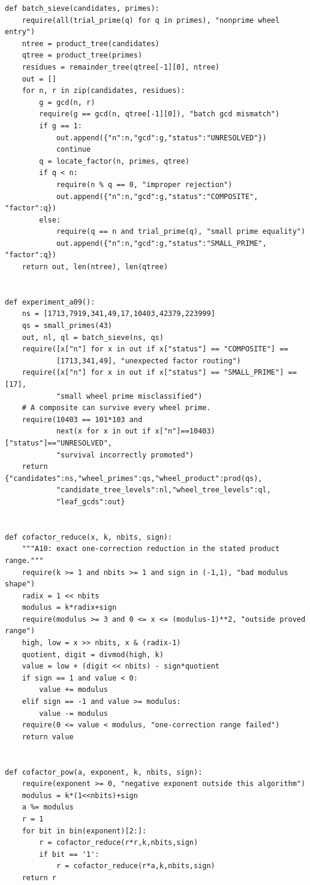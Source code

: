 \documentclass[11pt,a4paper]{article}
\theoremstyle{definition}\newtheorem{definition}[theorem]{Definition}
\theoremstyle{remark}\newtheorem{remark}[theorem]{Remark}
\begin{document}
\begin{lstlisting}[label=lst:arithmetic]
def batch_sieve(candidates, primes):
    require(all(trial_prime(q) for q in primes), "nonprime wheel entry")
    ntree = product_tree(candidates)
    qtree = product_tree(primes)
    residues = remainder_tree(qtree[-1][0], ntree)
    out = []
    for n, r in zip(candidates, residues):
        g = gcd(n, r)
        require(g == gcd(n, qtree[-1][0]), "batch gcd mismatch")
        if g == 1:
            out.append({"n":n,"gcd":g,"status":"UNRESOLVED"})
            continue
        q = locate_factor(n, primes, qtree)
        if q < n:
            require(n % q == 0, "improper rejection")
            out.append({"n":n,"gcd":g,"status":"COMPOSITE", "factor":q})
        else:
            require(q == n and trial_prime(q), "small prime equality")
            out.append({"n":n,"gcd":g,"status":"SMALL_PRIME", "factor":q})
    return out, len(ntree), len(qtree)


def experiment_a09():
    ns = [1713,7919,341,49,17,10403,42379,223999]
    qs = small_primes(43)
    out, nl, ql = batch_sieve(ns, qs)
    require([x["n"] for x in out if x["status"] == "COMPOSITE"] ==
            [1713,341,49], "unexpected factor routing")
    require([x["n"] for x in out if x["status"] == "SMALL_PRIME"] == [17],
            "small wheel prime misclassified")
    # A composite can survive every wheel prime.
    require(10403 == 101*103 and
            next(x for x in out if x["n"]==10403)["status"]=="UNRESOLVED",
            "survival incorrectly promoted")
    return {"candidates":ns,"wheel_primes":qs,"wheel_product":prod(qs),
            "candidate_tree_levels":nl,"wheel_tree_levels":ql,
            "leaf_gcds":out}


def cofactor_reduce(x, k, nbits, sign):
    """A10: exact one-correction reduction in the stated product range."""
    require(k >= 1 and nbits >= 1 and sign in (-1,1), "bad modulus shape")
    radix = 1 << nbits
    modulus = k*radix+sign
    require(modulus >= 3 and 0 <= x <= (modulus-1)**2, "outside proved range")
    high, low = x >> nbits, x & (radix-1)
    quotient, digit = divmod(high, k)
    value = low + (digit << nbits) - sign*quotient
    if sign == 1 and value < 0:
        value += modulus
    elif sign == -1 and value >= modulus:
        value -= modulus
    require(0 <= value < modulus, "one-correction range failed")
    return value


def cofactor_pow(a, exponent, k, nbits, sign):
    require(exponent >= 0, "negative exponent outside this algorithm")
    modulus = k*(1<<nbits)+sign
    a %= modulus
    r = 1
    for bit in bin(exponent)[2:]:
        r = cofactor_reduce(r*r,k,nbits,sign)
        if bit == '1':
            r = cofactor_reduce(r*a,k,nbits,sign)
    return r



\end{lstlisting}
\end{document}
